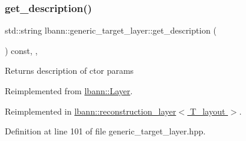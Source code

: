 \subsubsection{\texorpdfstring{get\+\_\+description()}{get\_description()}}
{\footnotesize\ttfamily std\+::string lbann\+::generic\+\_\+target\+\_\+layer\+::get\+\_\+description (\begin{DoxyParamCaption}{ }\end{DoxyParamCaption}) const\hspace{0.3cm}{\ttfamily [inline]}, {\ttfamily [override]}, {\ttfamily [virtual]}}

Returns description of ctor params 

Reimplemented from \hyperlink{classlbann_1_1Layer_acc0803d3428914ca1eb5988c4309174a}{lbann\+::\+Layer}.



Reimplemented in \hyperlink{classlbann_1_1reconstruction__layer_a738c3f06ea3cee1e8b11672fde6b594e}{lbann\+::reconstruction\+\_\+layer$<$ T\+\_\+layout $>$}.



Definition at line 101 of file generic\+\_\+target\+\_\+layer.\+hpp.


